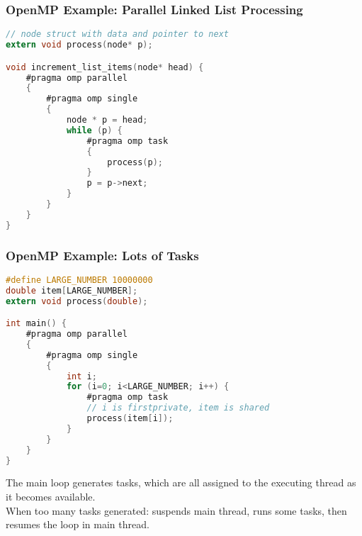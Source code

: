 \begin{frame}[fragile]
  \frametitle{OpenMP Example: Parallel Linked List Processing}

  
  \begin{lstlisting}[language=C,morekeywords={foreach,pragma,omp,parallel,single,nowait,task,untied,barrier,taskyield,mergeable,final,taskwait,critical}]
// node struct with data and pointer to next
extern void process(node* p);

void increment_list_items(node* head) {
    #pragma omp parallel
    {
        #pragma omp single
        {
            node * p = head;
            while (p) {
                #pragma omp task
                {
                    process(p);
                }
                p = p->next;
            }
        }
    }
}
  \end{lstlisting}
  
\end{frame}


\begin{frame}[fragile]
  \frametitle{OpenMP Example: Lots of Tasks}

  
  \begin{lstlisting}[language=C,morekeywords={foreach,pragma,omp,parallel,single,nowait,task,untied,barrier,taskyield,mergeable,final,taskwait,critical}]
#define LARGE_NUMBER 10000000
double item[LARGE_NUMBER];
extern void process(double);

int main() {
    #pragma omp parallel
    {
        #pragma omp single
        {
            int i;
            for (i=0; i<LARGE_NUMBER; i++) {
                #pragma omp task
                // i is firstprivate, item is shared
                process(item[i]);
            }
        }
    }
}
  \end{lstlisting}


  The main loop generates tasks, which are all assigned to the executing thread as it becomes available.\\[1em]
  When too many tasks generated: suspends main thread, runs some tasks, then resumes the loop in main thread.
  
\end{frame}


